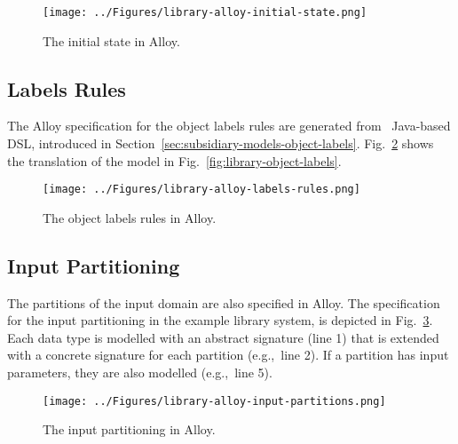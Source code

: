 \begin{figure}[h]
\centering
\texttt{[image: ../Figures/library-alloy-initial-state.png]}
\caption{The initial state in Alloy.}
\label{fig:library-alloy-initial-state}
\end{figure}

\subsection{Labels Rules}
\label{sec:alloy-labels-rules}
The Alloy specification for the object labels rules are generated from \this~Java-based DSL, introduced in Section~\ref{sec:subsidiary-models-object-labels}. Fig.~\ref{fig:library-alloy-labels-rules} shows the translation of the model in Fig.~\ref{fig:library-object-labels}.

\begin{figure}[h]
\centering
\texttt{[image: ../Figures/library-alloy-labels-rules.png]}
\caption{The object labels rules in Alloy.}
\label{fig:library-alloy-labels-rules}
\end{figure}

\subsection{Input Partitioning}
\label{sec:alloy-input-partitioning}
The partitions of the input domain are also specified in Alloy. The specification for the input partitioning in the example library system, is depicted in Fig.~\ref{fig:library-alloy-input-partitions}. Each data type is modelled with an abstract signature (line 1) that is extended with a concrete signature for each partition (e.g.,\ line 2). If a partition has input parameters, they are also modelled (e.g.,\ line 5).

\begin{figure}[h]
\centering
\texttt{[image: ../Figures/library-alloy-input-partitions.png]}
\caption{The input partitioning in Alloy.}
\label{fig:library-alloy-input-partitions}
\end{figure}


